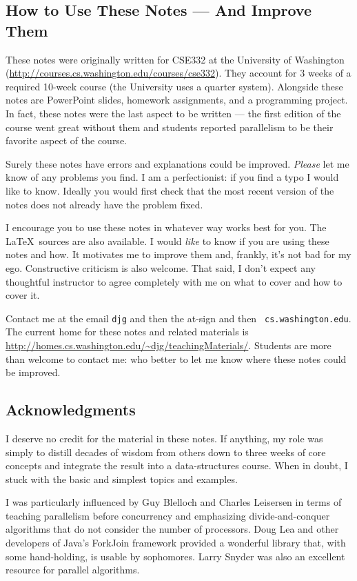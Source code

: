 \documentclass[10pt]{article}
\begin{document}
\subsection{How to Use These Notes --- And Improve Them}

These notes were originally written for CSE332 at the University of
Washington\\ (\url{http://courses.cs.washington.edu/courses/cse332}).
They account for 3 weeks of a required 10-week course (the University uses a
quarter system).  Alongside these notes are PowerPoint slides,
homework assignments, and a programming project.  In fact, these notes
were the last aspect to be written --- the first edition of the course
went great without them and students reported parallelism to be their favorite
aspect of the course.

Surely these notes have errors and explanations could be
improved.  \emph{Please} let me know of any problems you find.  I am a
perfectionist: if you find a typo I would like to know.  Ideally you
would first check that the most recent version of the notes does not
already have the problem fixed.

I encourage you to use these notes in whatever way works best for you.
The \LaTeX\ sources are also available.  I would \emph{like} to know if
you are using these notes and how.  It motivates me to improve them
and, frankly, it's not bad for my ego.  Constructive criticism
is also welcome.  That said, I don't expect any thoughtful instructor
to agree completely with me on what to cover and how to cover it.

Contact me at the email {\tt djg} and then the at-sign and then {\tt
  cs.washington.edu}.  The current home for these notes and related
  materials is 
\url{http://homes.cs.washington.edu/~djg/teachingMaterials/}.
  Students are more than welcome to contact me: who better to let me
  know where these notes could be improved.

\subsection{Acknowledgments}

I deserve no credit for the material in these notes.  If anything, my
role was simply to distill decades of wisdom from others down to three
weeks of core concepts and integrate the result into a data-structures
course.  When in doubt, I stuck with the basic and simplest topics and
examples.

I was particularly influenced by Guy Blelloch and Charles Leisersen in
terms of teaching parallelism before concurrency and emphasizing
divide-and-conquer algorithms that do not consider the number of
processors.  Doug Lea and other developers of Java's ForkJoin
framework provided a wonderful library that, with some hand-holding,
is usable by sophomores.  Larry Snyder was also an excellent resource
for parallel algorithms.  
\end{document}
